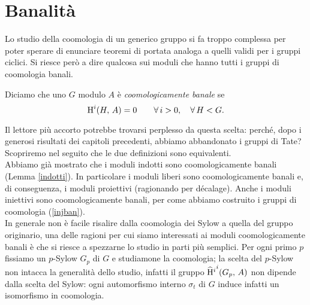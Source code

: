 %
%


\section{Banalità}
Lo studio della coomologia di un generico gruppo si fa troppo complessa per poter sperare di enunciare teoremi di portata analoga a quelli validi per i gruppi ciclici. Si riesce però a dire qualcosa sui moduli che hanno tutti i gruppi di coomologia banali.

\begin{definition}
	Diciamo che uno $ G $ modulo $ A $ è \emph{coomologicamente banale} se
	$$  \operatorname{H}^i(H, \, A) = 0 \qquad \forall \, i > 0, \quad  \forall \, H < G.  $$
\end{definition}

Il lettore più accorto potrebbe trovarsi perplesso da questa scelta: perché, dopo i generosi risultati dei capitoli precedenti, abbiamo abbandonato i gruppi di Tate? Scopriremo nel seguito che le due definizioni sono equivalenti. \\

Abbiamo già mostrato che i moduli indotti sono coomologicamente banali (Lemma \ref{indotti}). In particolare i moduli liberi sono coomologicamente banali e, di conseguenza, i moduli proiettivi (ragionando per décalage). Anche i moduli iniettivi sono coomologicamente banali, per come abbiamo costruito i gruppi di coomologia (\ref{injban}). \\

In generale non è facile risalire dalla coomologia dei Sylow a quella del gruppo originario, una delle ragioni per cui siamo interessati ai moduli coomologicamente banali è che si riesce a spezzarne lo studio in parti più semplici. Per ogni primo $ p $ fissiamo un $ p $-Sylow $ G_p $ di $ G $ e studiamone la coomologia; la scelta del $ p $-Sylow non intacca la generalità dello studio, infatti il gruppo $ \operatorname{\widehat{H}^\mathnormal{i}}^i(G_p, \, A) $ non dipende dalla scelta del Sylow: ogni automorfismo interno $ \sigma_t $ di $ G $ induce infatti un isomorfismo in coomologia. 

